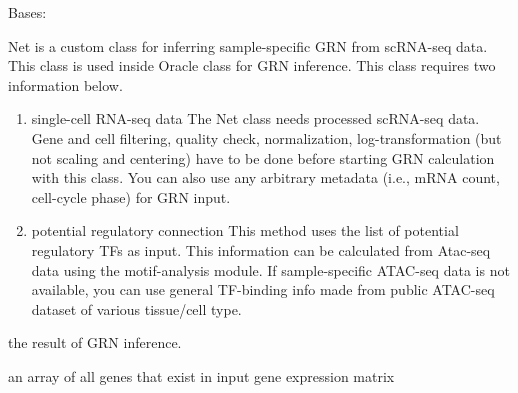 \documentclass[letterpaper,10pt,english]{sphinxmanual}
\begin{document}

\begin{fulllineitems}
\label{\detokenize{modules/celloracle:celloracle.Net}}
Bases: 

Net is a custom class for inferring sample-specific GRN from scRNA-seq data.
This class is used inside Oracle class for GRN inference.
This class requires two information below.
\begin{enumerate}
\item {} 
single-cell RNA-seq data
The Net class needs processed scRNA-seq data.
Gene and cell filtering, quality check, normalization, log-transformation (but not scaling and centering) have to be done before starting GRN calculation with this class.
You can also use any arbitrary metadata (i.e., mRNA count, cell-cycle phase) for GRN input.

\item {} 
potential regulatory connection
This method uses the list of potential regulatory TFs as input.
This information can be calculated from Atac-seq data using the motif-analysis module.
If sample-specific ATAC-seq data is not available,
you can use general TF-binding info made from public ATAC-seq dataset of various tissue/cell type.

\end{enumerate}

\begin{fulllineitems}
\label{\detokenize{modules/celloracle:celloracle.Net.linkList}}
 \textendash{} the result of GRN inference.

\end{fulllineitems}


\begin{fulllineitems}
\label{\detokenize{modules/celloracle:celloracle.Net.all_genes}}
 \textendash{} an array of all genes that exist in input gene expression matrix


\end{fulllineitems}
\end{fulllineitems}
\end{document}
